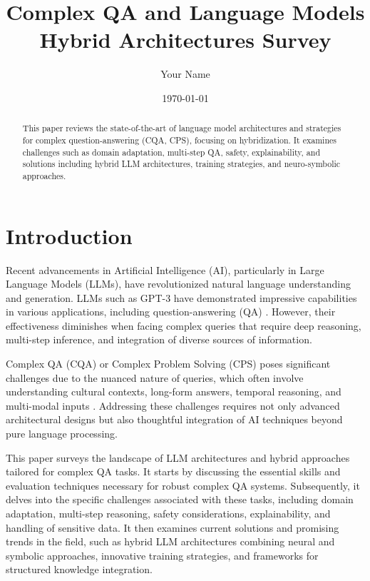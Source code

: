 \documentclass[a4paper,12pt]{article}
\title{Complex QA and Language Models Hybrid Architectures Survey}
\author{Your Name}
\date{\today}
\begin{document}
\maketitle

\begin{abstract}
    This paper reviews the state-of-the-art of language model architectures and strategies for complex question-answering (CQA, CPS), focusing on hybridization. It examines challenges such as domain adaptation, multi-step QA, safety, explainability, and solutions including hybrid LLM architectures, training strategies, and neuro-symbolic approaches.
\end{abstract}

\tableofcontents
\newpage

\section{Introduction}
\label{sec:introduction}

Recent advancements in Artificial Intelligence (AI), particularly in Large Language Models (LLMs), have revolutionized natural language understanding and generation. LLMs such as GPT-3 have demonstrated impressive capabilities in various applications, including question-answering (QA) \cite{gpt3_paper}. However, their effectiveness diminishes when facing complex queries that require deep reasoning, multi-step inference, and integration of diverse sources of information.

Complex QA (CQA) or Complex Problem Solving (CPS) poses significant challenges due to the nuanced nature of queries, which often involve understanding cultural contexts, long-form answers, temporal reasoning, and multi-modal inputs \cite{transformers_paper}. Addressing these challenges requires not only advanced architectural designs but also thoughtful integration of AI techniques beyond pure language processing.

This paper surveys the landscape of LLM architectures and hybrid approaches tailored for complex QA tasks. It starts by discussing the essential skills and evaluation techniques necessary for robust complex QA systems. Subsequently, it delves into the specific challenges associated with these tasks, including domain adaptation, multi-step reasoning, safety considerations, explainability, and handling of sensitive data. It then examines current solutions and promising trends in the field, such as hybrid LLM architectures combining neural and symbolic approaches, innovative training strategies, and frameworks for structured knowledge integration.
\end{document}
